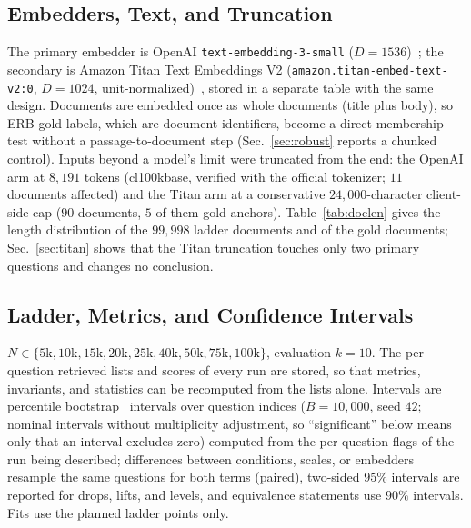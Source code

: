 \documentclass{ieeeaccess}
\makeatletter
\DeclareRobustCommand{\_}{\ifmmode\nfss@text{\textunderscore}\else\textunderscore\allowbreak\fi}
\makeatother
\begin{document}
\subsection{Embedders, Text, and Truncation}
The primary embedder is OpenAI \texttt{text-embedding-3-small} ($D{=}1536$)~\cite{openai2024embed}; the secondary is Amazon Titan Text Embeddings V2 (\texttt{amazon.titan-embed-text-v2:0}, $D{=}1024$, unit-normalized)~\cite{aws2024titan}, stored in a separate table with the same design. Documents are embedded once as whole documents (title plus body), so ERB gold labels, which are document identifiers, become a direct membership test without a passage-to-document step (Sec.~\ref{sec:robust} reports a chunked control). Inputs beyond a model's limit were truncated from the end: the OpenAI arm at $8{,}191$ tokens (cl100k\_base, verified with the official tokenizer; $11$ documents affected) and the Titan arm at a conservative $24{,}000$-character client-side cap ($90$ documents, $5$ of them gold anchors). Table~\ref{tab:doclen} gives the length distribution of the $99{,}998$ ladder documents and of the gold documents; Sec.~\ref{sec:titan} shows that the Titan truncation touches only two primary questions and changes no conclusion.



\subsection{Ladder, Metrics, and Confidence Intervals}
$N\in\{5\text{k},10\text{k},15\text{k},20\text{k},25\text{k},40\text{k},50\text{k},75\text{k},100\text{k}\}$, evaluation $k{=}10$. The per-question retrieved lists and scores of every run are stored, so that metrics, invariants, and statistics can be recomputed from the lists alone. Intervals are percentile bootstrap~\cite{efron1993bootstrap} intervals over question indices ($B{=}10{,}000$, seed $42$; nominal intervals without multiplicity adjustment, so ``significant'' below means only that an interval excludes zero) computed from the per-question flags of the run being described; differences between conditions, scales, or embedders resample the same questions for both terms (paired), two-sided $95\%$ intervals are reported for drops, lifts, and levels, and equivalence statements use $90\%$ intervals. Fits use the planned ladder points only.
\end{document}
